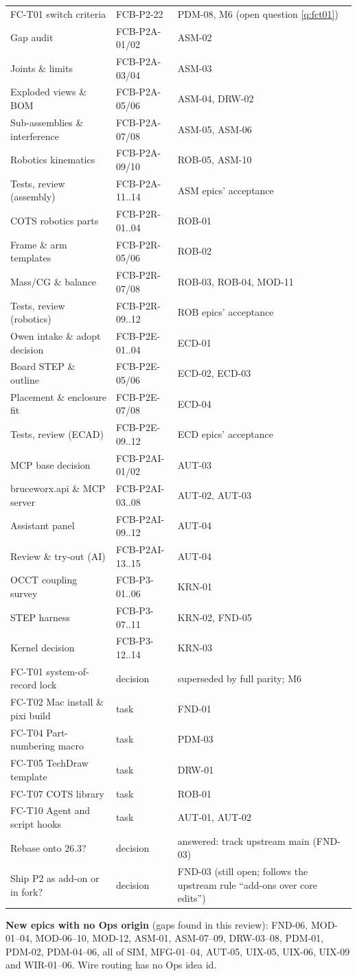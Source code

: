\begin{center}
\begin{longtable}{@{}p{4.6cm}p{4.2cm}p{6.6cm}@{}}
FC-T01 switch criteria & FCB-P2-22 & PDM-08, M6 (open question \ref{q:fct01})\\
Gap audit & FCB-P2A-01/02 & ASM-02\\
Joints \& limits & FCB-P2A-03/04 & ASM-03\\
Exploded views \& BOM & FCB-P2A-05/06 & ASM-04, DRW-02\\
Sub-assemblies \& interference & FCB-P2A-07/08 & ASM-05, ASM-06\\
Robotics kinematics & FCB-P2A-09/10 & ROB-05, ASM-10\\
Tests, review (assembly) & FCB-P2A-11..14 & ASM epics' acceptance\\
COTS robotics parts & FCB-P2R-01..04 & ROB-01\\
Frame \& arm templates & FCB-P2R-05/06 & ROB-02\\
Mass/CG \& balance & FCB-P2R-07/08 & ROB-03, ROB-04, MOD-11\\
Tests, review (robotics) & FCB-P2R-09..12 & ROB epics' acceptance\\
Owen intake \& adopt decision & FCB-P2E-01..04 & ECD-01\\
Board STEP \& outline & FCB-P2E-05/06 & ECD-02, ECD-03\\
Placement \& enclosure fit & FCB-P2E-07/08 & ECD-04\\
Tests, review (ECAD) & FCB-P2E-09..12 & ECD epics' acceptance\\
MCP base decision & FCB-P2AI-01/02 & AUT-03\\
bruceworx.api \& MCP server & FCB-P2AI-03..08 & AUT-02, AUT-03\\
Assistant panel & FCB-P2AI-09..12 & AUT-04\\
Review \& try-out (AI) & FCB-P2AI-13..15 & AUT-04\\
OCCT coupling survey & FCB-P3-01..06 & KRN-01\\
STEP harness & FCB-P3-07..11 & KRN-02, FND-05\\
Kernel decision & FCB-P3-12..14 & KRN-03\\
\midrule
FC-T01 system-of-record lock & decision & superseded by full parity; M6\\
FC-T02 Mac install \& pixi build & task & FND-01\\
FC-T04 Part-numbering macro & task & PDM-03\\
FC-T05 TechDraw template & task & DRW-01\\
FC-T07 COTS library & task & ROB-01\\
FC-T10 Agent and script hooks & task & AUT-01, AUT-02\\
Rebase onto 26.3? & decision & answered: track upstream main (FND-03)\\
Ship P2 as add-on or in fork? & decision & FND-03 (still open; follows the upstream rule ``add-ons over core edits'')\\
\end{longtable}
\end{center}

\noindent
\textbf{New epics with no Ops origin} (gaps found in this review): FND-06, MOD-01--04, MOD-06--10,
MOD-12, ASM-01, ASM-07--09, DRW-03--08, PDM-01, PDM-02, PDM-04--06, all of SIM, MFG-01--04, AUT-05, UIX-05,
UIX-06, UIX-09 and WIR-01--06. Wire routing has no Ops idea id.
